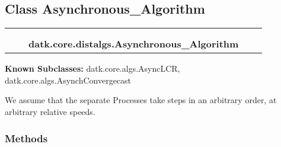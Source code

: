 \subsection{Class Asynchronous\_Algorithm}

    \label{datk:core:distalgs:Asynchronous_Algorithm}
\begin{tabular}{cccccc}
\multicolumn{2}{r}{\settowidth{\BCL}{datk.core.distalgs.Algorithm}\multirow{2}{\BCL}{datk.core.distalgs.Algorithm}}
&&
  \\\cline{3-3}
  &&\multicolumn{1}{c|}{}
&&
  \\
&&\multicolumn{2}{l}{\textbf{datk.core.distalgs.Asynchronous\_Algorithm}}
\end{tabular}

\textbf{Known Subclasses:}
datk.core.algs.AsyncLCR,
    datk.core.algs.AsynchConvergecast

We assume that the separate Processes take steps in an arbitrary order, at 
arbitrary relative speeds.



  \subsubsection{Methods}

    \vspace{0.5ex}

